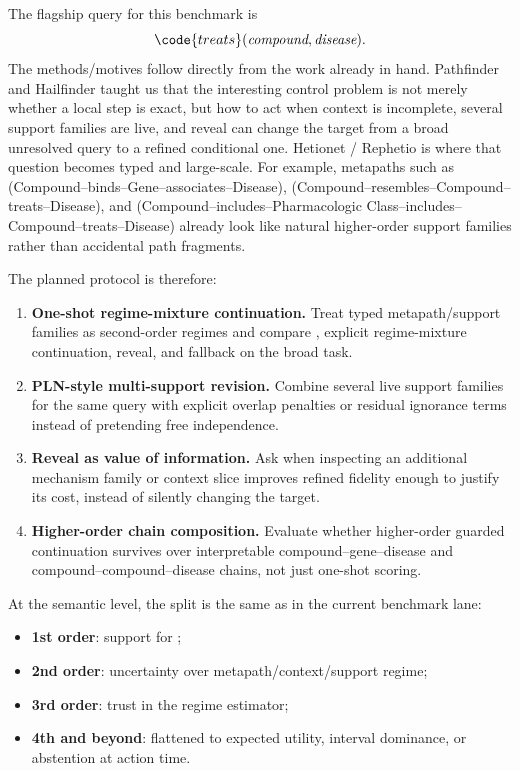 \documentclass[11pt,openany]{report}
\begin{document}
The flagship query for this benchmark is
\[
  \code{treats}(\textit{compound}, \textit{disease}).
\]
The methods/motives follow directly from the work already in hand.
Pathfinder and Hailfinder taught us that the interesting control problem
is not merely whether a local step is exact, but how to act when context
is incomplete, several support families are live, and reveal can change
the target from a broad unresolved query to a refined conditional one.
Hetionet / Rephetio is where that question becomes typed and large-scale.
For example, metapaths such as
 (Compound--binds--Gene--associates--Disease),
 (Compound--resembles--Compound--treats--Disease), and
 (Compound--includes--Pharmacologic Class--includes--Compound--treats--Disease)
already look like natural higher-order support families rather than
accidental path fragments.
\par
The planned protocol is therefore:
\begin{enumerate}
\item \textbf{One-shot regime-mixture continuation.}  Treat typed
  metapath/support families as second-order regimes and compare
  , explicit regime-mixture continuation, reveal, and
  fallback on the broad  task.
\item \textbf{PLN-style multi-support revision.}  Combine several live
  support families for the same query with explicit overlap penalties or
  residual ignorance terms instead of pretending free independence.
\item \textbf{Reveal as value of information.}  Ask when inspecting an
  additional mechanism family or context slice improves refined fidelity
  enough to justify its cost, instead of silently changing the target.
\item \textbf{Higher-order chain composition.}  Evaluate whether
  higher-order guarded continuation survives over interpretable
  compound--gene--disease and compound--compound--disease chains, not
  just one-shot scoring.
\end{enumerate}
At the semantic level, the split is the same as in the current
benchmark lane:
\begin{itemize}
\item \textbf{1st order}: support for ;
\item \textbf{2nd order}: uncertainty over metapath/context/support
  regime;
\item \textbf{3rd order}: trust in the regime estimator;
\item \textbf{4th and beyond}: flattened to expected utility, interval
  dominance, or abstention at action time.
\end{itemize}
\end{document}

